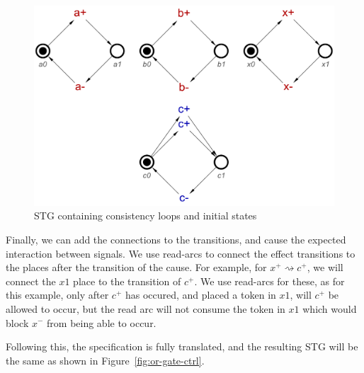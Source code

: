 \documentclass[british,conference,compsoc]{IEEEtran}
\begin{document}
\begin{figure}[h]
\begin{centering}
\includegraphics[scale=0.25]{Images/or-gate-ctrl-inits-stg}
\par\end{centering}
\protect\caption{\label{fig:tokens} STG containing consistency loops and initial states}
\end{figure}

Finally, we can add the connections to the transitions, and cause the 
expected interaction between signals. We use read-arcs to connect the effect
transitions to the places after the transition of the cause. For example, for
$x^{+} \rightsquigarrow c^{+}$, we will connect the $x1$ place to the 
transition of $c^{+}$. We use read-arcs for these, as for this example, only
after $c^{+}$ has occured, and placed a token in $x1$, will $c^{+}$ be allowed
to occur, but the read arc will not consume the token in $x1$ which would block
$x^{-}$ from being able to occur. 

Following this, the specification is fully translated, and the resulting STG will
be the same as shown in Figure~\ref{fig:or-gate-ctrl}.


\end{document}
